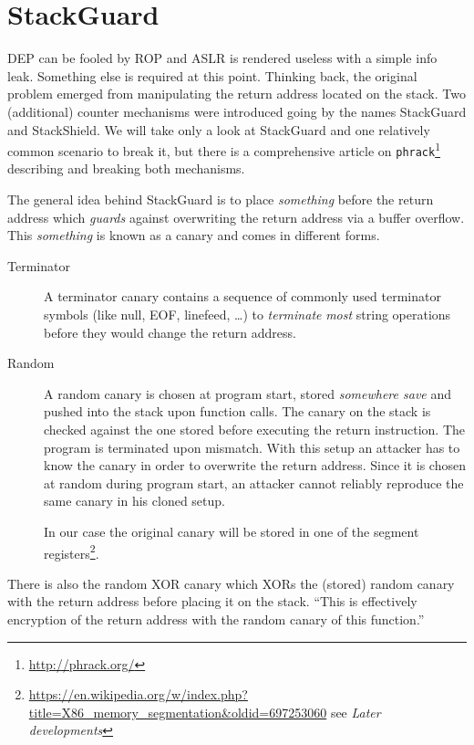 \documentclass[article]{uibk}
\begin{document}
\section{StackGuard}

DEP can be fooled by ROP and ASLR is rendered useless with a simple info leak.
Something else is required at this point. Thinking back, the original problem
emerged from manipulating the return address located on the stack. Two
(additional) counter mechanisms were introduced going by the names StackGuard
and StackShield. We will take only a look at StackGuard and one relatively
common scenario to break it, but there is a comprehensive article
\cite{phrack_stack_guard} on \texttt{phrack}\footnote{\url{http://phrack.org/}}
describing and breaking both mechanisms.

The general idea behind StackGuard is to place \emph{something} before the
return address which \emph{guards} against overwriting the return address via a
buffer overflow. This \emph{something} is known as a canary and comes in
different forms.

\begin{description}
    \item[Terminator] A terminator canary contains a sequence of commonly used
        terminator symbols (like null, EOF, linefeed, \dots) to
        \emph{terminate} \emph{most} string operations before they would change
        the return address.

    \item[Random] A random canary is chosen at program start, stored
        \textit{somewhere save} and pushed into the stack upon function calls.
        The canary on the stack is checked against the one stored before
        executing the return instruction. The program is terminated upon
        mismatch. With this setup an attacker has to know the canary in order
        to overwrite the return address. Since it is chosen at random during
        program start, an attacker cannot reliably reproduce the same canary in
        his cloned setup.

        In our case the original canary will be stored in one of the segment
        registers\footnote{\url{https://en.wikipedia.org/w/index.php?title=X86_memory_segmentation&oldid=697253060}
        see \textit{Later developments}}.
\end{description}

There is also the random XOR canary which XORs the (stored) random canary with
the return address before placing it on the stack. ``This is effectively
encryption of the return address with the random canary of this
function.''~\cite{phrack_stack_guard}
\end{document}

